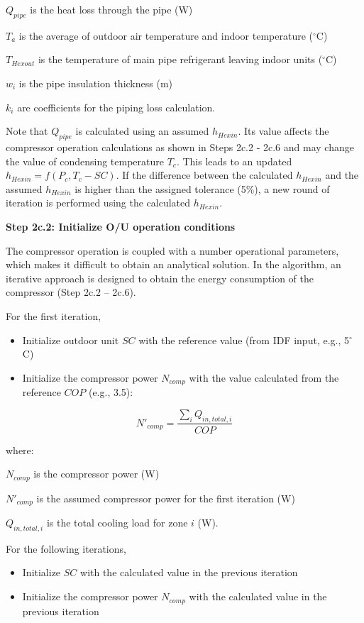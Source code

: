 $Q_{pipe}$ is the heat loss through the pipe (W)

$T_a$ is the average of outdoor air temperature and indoor temperature (\(^{\circ}\)C)

$T_{Hexout}$ is the temperature of main pipe refrigerant leaving indoor units (\(^{\circ}\)C)

$w_i$ is the pipe insulation thickness (m)

$k_i$ are coefficients for the piping loss calculation.

Note that $Q_{pipe}$ is calculated using an assumed $h_{Hexin}$. Its value affects the compressor operation calculations as shown in Steps 2c.2 - 2c.6 and may change the value of condensing temperature $T_c$. This leads to an updated $h_{Hexin}=f(P_c,T_c-SC)$. If the difference between the calculated $h_{Hexin}$ and the assumed $h_{Hexin}$ is higher than the assigned tolerance (5\%), a new round of iteration is performed using the calculated $h_{Hexin}$.

\textbf{Step 2c.2: Initialize O/U operation conditions}

The compressor operation is coupled with a number operational parameters, which makes it difficult to obtain an analytical solution. In the algorithm, an iterative approach is designed to obtain the energy consumption of the compressor (Step 2c.2 – 2c.6).

For the first iteration,

\begin{itemize}
  \item
    Initialize outdoor unit $SC$ with the reference value (from IDF input, e.g., 5\(^{\circ}\)C)
  \item
    Initialize the compressor power $N_{comp}$ with the value calculated from the reference $COP$ (e.g., 3.5):
\end{itemize}

\begin{equation}N'_{comp}=\frac{\sum_iQ_{in,total,i}}{COP}\end{equation}

where:

$N_{comp}$ is the compressor power (W)

$N'_{comp}$ is the assumed compressor power for the first iteration (W)

$Q_{in,total,i}$ is the total cooling load for zone $i$ (W).

For the following iterations,

\begin{itemize}
\item Initialize $SC$ with the calculated value in the previous iteration
\item Initialize the compressor power $N_{comp}$ with the calculated value in the previous iteration
\end{itemize}

